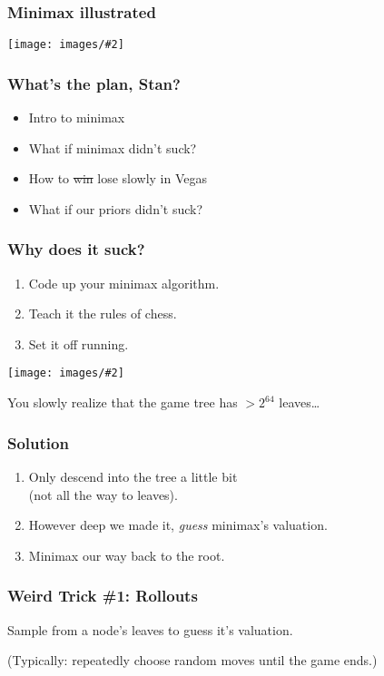 \documentclass[table]{beamer}
\newcommand\img[2]{\texttt{[image: images/\#2]}}
\begin{document}
\begin{frame}
	\frametitle{Minimax illustrated}
	\begin{center}
		\img{1}{games-7.jpg}
	\end{center}
\end{frame}

\begin{frame}
	\frametitle{What's the plan, Stan?}
	\begin{itemize}
		\setlength\itemsep{5ex}
		\item Intro to minimax
		\item \alert{What if minimax didn't suck?}
		\item How to \sout{win} lose slowly in Vegas
		\item What if our priors didn't suck?
	\end{itemize}
\end{frame}

\begin{frame}
	\frametitle{Why does it suck?}
	\begin{enumerate}
		\item Code up your minimax algorithm.
		\item Teach it the rules of chess.
		\item Set it off running.
	\end{enumerate}

	\begin{center}
		\img{0.4}{hourglass.jpg}
	\end{center}

	You slowly realize that the game tree has $>2^{64}$ leaves\ldots
\end{frame}

\begin{frame}
	\frametitle{Solution}
	\begin{enumerate}
		\item Only descend into the tree a little bit\\(not all the way to
			leaves).
		\item However deep we made it, \emph{guess}\footnotemark{} minimax's valuation.
		\item Minimax our way back to the root.
	\end{enumerate}
\end{frame}

\begin{frame}
	\frametitle{Weird Trick \#1: Rollouts}
	\alert{Sample} from a node's leaves to guess it's valuation.\footnotemark

	\vspace{8ex}

	(Typically: repeatedly choose random moves until the game ends.)

	\footnotetext{\img{0.05}{hands-up.jpg}}
\end{frame}
\end{document}
